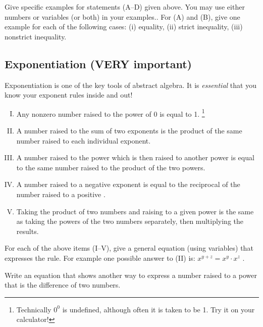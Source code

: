 \begin{exercise}\label{exercise:BeforeWeBegin:4}
Give specific examples for statements (A--D)   given above. You may use either numbers or variables (or both) in your examples.. For (A) and (B), give one example for each of the following cases: (i) equality, (ii) strict inequality, (iii) nonstrict inequality.
\end{exercise}


%
%

\subsection {Exponentiation (VERY important)}

Exponentiation is one of the key tools of abstract algebra. It is \emph{essential} that you know your exponent rules inside and out!  

\begin{enumerate}[(I)]
\item
Any nonzero number raised to the power of 0 is equal to 1.
\footnote{ Technically $0^0$ is undefined, although often it is taken to be 1. Try it on your calculator!}
\item
A number raised to the sum of two exponents  is the product of the same number raised to each individual exponent.
\item
A number raised to the power which is then raised to another power is equal to the same number raised to the product of the two powers.
\item
A number raised to a negative exponent is equal to the reciprocal of the number  raised to a positive .
\item
Taking the  product of two numbers  and raising to a given power is the same as taking the powers of the two numbers separately, then multiplying the results.
\end{enumerate}

\begin{exercise}\label{exercise:BeforeWeBegin:5}
For each of the above items (I--V),  give a general equation (using variables) that expresses the rule.  For example one possible answer to (II) is:  $x^{y+z} = x^y \cdot x^z$ .
\end{exercise}
\begin{exercise}\label{exercise:BeforeWeBegin:6}
Write an equation that shows another way to express a number raised to a power that is the difference of two numbers.
\end{exercise}

